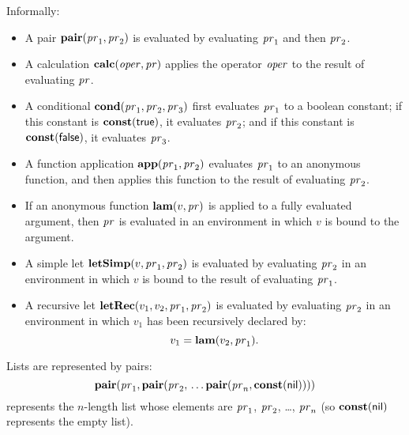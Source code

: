 Informally:
\begin{itemize}
\item A pair $\mathbf{pair}(\mathit{pr}_1,\mathit{pr}_2)$ is evaluated by evaluating
  $\mathit{pr}_1$ and then $\mathit{pr}_2$.

\item A calculation $\mathbf{calc}(\mathit{oper},\mathit{pr})$ applies the operator
  $\mathit{oper}$ to the result of evaluating $\mathit{pr}$.

\item A conditional $\mathbf{cond}(\mathit{pr}_1,\mathit{pr}_2,\mathit{pr}_3)$ first evaluates
  $\mathit{pr}_1$ to a boolean constant; if this constant is
  $\mathbf{const}(\mathsf{true})$, it evaluates $\mathit{pr}_2$; and if this constant
  is $\mathbf{const}(\mathsf{false})$, it evaluates $\mathit{pr}_3$.

\item A function application $\mathbf{app}(\mathit{pr}_1, \mathit{pr}_2)$ evaluates
  $\mathit{pr}_1$ to an anonymous function, and then applies this function
  to the result of evaluating $\mathit{pr}_2$.

\item If an anonymous function $\mathbf{lam}(v,\mathit{pr})$ is applied to a fully
  evaluated argument, then $\mathit{pr}$ is evaluated in an environment in
  which $v$ is bound to the argument.

\item A simple let $\mathbf{letSimp}(v, \mathit{pr}_1, \mathit{pr}_2)$ is evaluated by
  evaluating $\mathit{pr}_2$ in an environment in which $v$ is bound to the
  result of evaluating $\mathit{pr}_1$.

\item A recursive let $\mathbf{letRec}(v_1,v_2,\mathit{pr}_1,\mathit{pr}_2)$ is evaluated
  by evaluating $\mathit{pr}_2$ in an environment in which $v_1$ has been
  recursively declared by:
  \begin{displaymath}
    v_1 = \mathbf{lam}(v_2, \mathit{pr}_1) .
  \end{displaymath}
\end{itemize}

Lists are represented by pairs:
\begin{displaymath}
  \mathbf{pair}(\mathit{pr}_1,\mathbf{pair}(\mathit{pr}_2,\,\ldots \mathbf{pair}(\mathit{pr}_n,
  \mathbf{const}(\mathsf{nil}))))
\end{displaymath}
represents the $n$-length list whose elements are $\mathit{pr}_1$, $\mathit{pr}_2$, \ldots,
$\mathit{pr}_n$ (so $\mathbf{const}(\mathsf{nil})$ represents the empty list).

